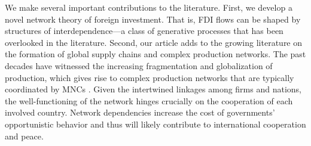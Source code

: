 \documentclass[reqno,onecolumn,letterpaper,12pt]{article}
\begin{document}
We make several important contributions to the literature. First, we develop a novel network theory of foreign investment. That is, FDI flows can be shaped by structures of interdependence---a class of generative processes that has been overlooked in the literature. %
Second, our article adds to the growing literature on the formation of global supply chains and complex production networks. The past decades have witnessed the increasing fragmentation and globalization of production, which gives rise to complex production networks that are typically coordinated by MNCs \citep{UNCTAD:2013,Baldwin:2011}. Given the intertwined linkages among firms and nations, the well-functioning of the network hinges crucially on the cooperation of each involved country. %
Network dependencies increase the cost of governments' opportunistic behavior and thus will likely contribute to international cooperation and peace.
\end{document}
